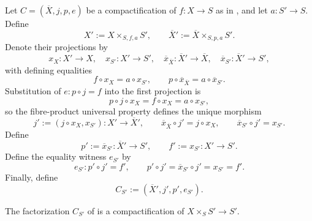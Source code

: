 \begin{definition}
  \label{def:nagata-compactification-base-change}
  \lean{}

  Let $C=(\overline X,j,p,e)$ be a compactification of
  $f\colon X\to S$ as in , and let
  $a\colon S'\to S$.  Define
  \[
    X':=X\times_{S,f,a}S',
    \qquad
    \overline X':=\overline X\times_{S,p,a}S'.
  \]
  Denote their projections by
  \[
    x_X\colon X'\to X,
    \quad x_{S'}\colon X'\to S',
    \quad
    \overline x_{\overline X}\colon\overline X'\to\overline X,
    \quad \overline x_{S'}\colon\overline X'\to S',
  \]
  with defining equalities
  \[
    f\circ x_X=a\circ x_{S'},
    \qquad
    p\circ\overline x_{\overline X}=a\circ\overline x_{S'}.
  \]
  Substitution of $e\colon p\circ j=f$ into the first projection is
  \[
    p\circ j\circ x_X
      =f\circ x_X
      =a\circ x_{S'},
  \]
  so the fibre-product universal property defines the unique morphism
  \[
    j':=(j\circ x_X,x_{S'})\colon X'\longrightarrow\overline X',
    \qquad
    \overline x_{\overline X}\circ j'=j\circ x_X,
    \qquad
    \overline x_{S'}\circ j'=x_{S'}.
  \]
  Define
  \[
    p':=\overline x_{S'}\colon\overline X'\to S',
    \qquad
    f':=x_{S'}\colon X'\to S'.
  \]
  Define the equality witness $e_{S'}$ by
  \[
    e_{S'}\colon p'\circ j'=f',
    \qquad
    p'\circ j'
      =\overline x_{S'}\circ j'
      =x_{S'}=f'.
  \]
  Finally, define
  \[
    C_{S'}:=(\overline X',j',p',e_{S'}).
  \]
\end{definition}

\begin{lemma}
  \label{lemma:nagata-compactification-base-change}
  \lean{}

  The factorization $C_{S'}$ of
   is a compactification of
  $X\times_SS'\to S'$.
\end{lemma}

